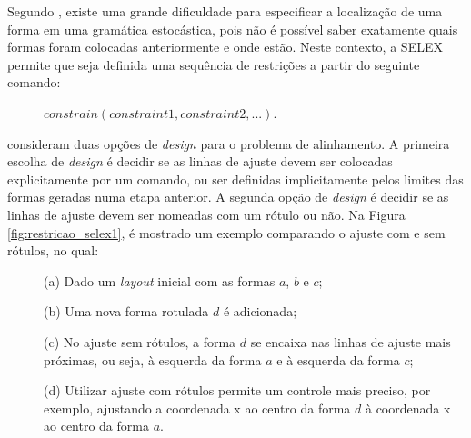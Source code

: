 Segundo , existe uma grande dificuldade para especificar a localização de uma forma em uma gramática estocástica, pois não é possível saber exatamente quais formas foram colocadas anteriormente e onde estão. Neste contexto, a \gls{SELEX} permite que seja definida uma sequência de restrições a partir do seguinte comando:

\vspace{0.3cm}

\begin{description}
    \item[] \qquad \qquad $constrain(constraint1, constraint2, ...)$.
\end{description}

\vspace{0.3cm}

 consideram duas opções de \textit{design} para o problema de alinhamento. A primeira escolha de \textit{design} é decidir se as linhas de ajuste devem ser colocadas explicitamente por um comando, ou ser definidas implicitamente pelos limites das formas geradas numa etapa anterior. A segunda opção de \textit{design} é decidir se as linhas de ajuste devem ser nomeadas com um rótulo ou não. Na Figura \ref{fig:restricao_selex1}, é mostrado um exemplo comparando o ajuste com e sem rótulos, no qual: 

\begin{description}
    \item[] \; (a) Dado um \textit{layout} inicial com as formas $a$, $b$ e $c$;
    
    \item[] \; (b) Uma nova forma rotulada $d$ é adicionada;
    
    \item[] \; (c) No ajuste sem rótulos, a forma $d$ se encaixa nas linhas de ajuste mais próximas, ou seja, à esquerda da forma $a$ e à esquerda da forma $c$;
    
    \item[] \; (d) Utilizar ajuste com rótulos permite um controle mais preciso, por exemplo, ajustando a coordenada x ao centro da forma $d$ à coordenada x ao centro da forma $a$.
\end{description}

\begin{figure}[h!]
	\centering
	\captionsetup{width=15cm}
	{}	
\end{figure}

